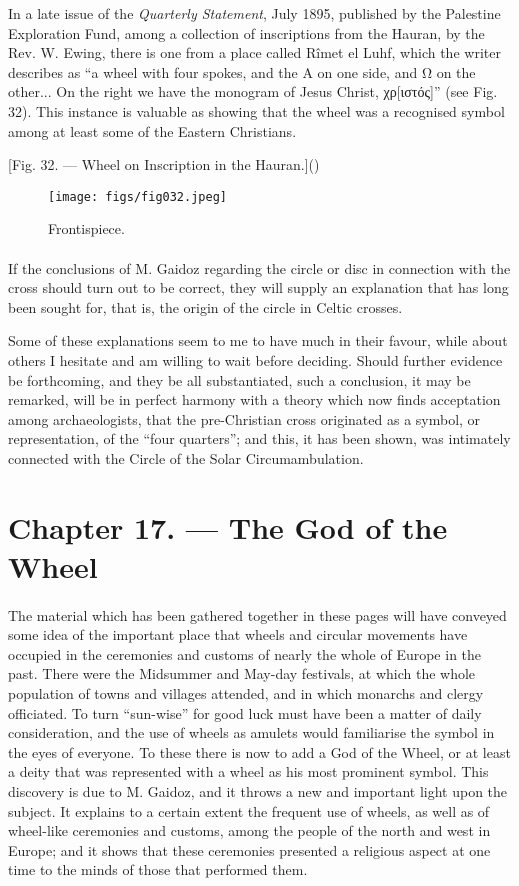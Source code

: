 \documentclass[a4paper, 11pt, oneside, polutonikogreek, english]{article}
\begin{document}
In a late issue of the \emph{Quarterly Statement}, July 1895, published by the Palestine Exploration Fund, among a collection of inscriptions from the Hauran, by the Rev. W. Ewing, there is one from a place called Rîmet el Luhf, which the writer describes as ``a wheel with four spokes, and the Α on one side, and Ω on the other... On the right we have the monogram of Jesus Christ, χρ[ιστός]'' (see Fig. 32). This instance is valuable as showing that the wheel was a recognised symbol among at least some of the Eastern Christians.

[Fig. 32. --- Wheel on Inscription in the Hauran.]()
\begin{figure}[H]
\centering
\texttt{[image: figs/fig032.jpeg]}
\caption{Frontispiece.}
\end{figure}
\paragraph{}
If the conclusions of M. Gaidoz regarding the circle or disc in connection with the cross should turn out to be correct, they will supply an explanation that has long been sought for, that is, the origin of the circle in Celtic crosses.

Some of these explanations seem to me to have much in their favour, while about others I hesitate and am willing to wait before deciding. Should further evidence be forthcoming, and they be all substantiated, such a conclusion, it may be remarked, will be in perfect harmony with a theory which now finds acceptation among archaeologists, that the pre-Christian cross originated as a symbol, or representation, of the ``four quarters''; and this, it has been shown, was intimately connected with the Circle of the Solar Circumambulation.
\clearpage
\section{Chapter 17. --- The God of the Wheel}
\paragraph{}
The material which has been gathered together in these pages will have conveyed some idea of the important place that wheels and circular movements have occupied in the ceremonies and customs of nearly the whole of Europe in the past. There were the Midsummer and May-day festivals, at which the whole population of towns and villages attended, and in which monarchs and clergy officiated. To turn ``sun-wise'' for good luck must have been a matter of daily consideration, and the use of wheels as amulets would familiarise the symbol in the eyes of everyone. To these there is now to add a God of the Wheel, or at least a deity that was represented with a wheel as his most prominent symbol. This discovery is due to M. Gaidoz, and it throws a new and important light upon the subject. It explains to a certain extent the frequent use of wheels, as well as of wheel-like ceremonies and customs, among the people of the north and west in Europe; and it shows that these ceremonies presented a religious aspect at one time to the minds of those that performed them.
\end{document}
